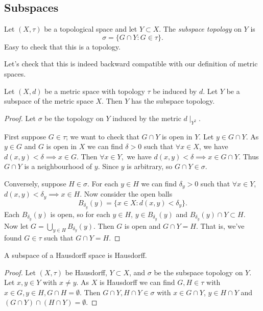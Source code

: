 \subsection{Subspaces}
\vspace{3mm}
\begin{definition}
Let $(X,\tau)$ be a topological space and let $Y\subset X$. The \emph{subspace topology} on $Y$ is \[ \sigma = \{G\cap Y : G\in \tau \}.\] Easy to check that this is a topology.
\end{definition}

Let's check that this is indeed backward compatible with our definition of metric spaces.

\begin{proposition}                        %
Let $(X,d)$ be a metric space with topology $\tau$ be induced by $d$. Let $Y$ be a subspace of the metric space $X$. Then $Y$ has the subspace topology.
\end{proposition}  
\begin{proof}
Let $\sigma$ be the topology on $Y$ induced by the metric $d\mid_{Y^2}$. 

First suppose $G\in \tau$; we want to check that $G\cap Y$ is open in $Y$. Let $y\in G\cap Y$. As $y\in G$ and $G$ is open in $X$ we can find $\delta >0$ such that $\forall x\in X$, we have $d(x,y)<\delta \implies x\in G$. Then $\forall x\in Y,$ we have $d(x,y)<\delta \implies x \in G\cap Y$. Thus $G\cap Y$ is a neighbourhood of $y$. Since $y$ is arbitrary, so $G\cap Y\in \sigma$.

Conversely, suppose $H\in \sigma$. For each $y\in H$ we can find $\delta_y>0$ such that $\forall x\in Y$, $d(x,y)<\delta_y\implies x\in H$. Now consider the open balls\[B_{\delta_y}(y) = \{x\in X : d(x,y) < \delta_y\}. \] Each $B_{\delta_y}(y)$ is open, so for each $y\in H$, $y\in B_{\delta_y}(y)$ and $B_{\delta_y}(y)\cap Y\subset H$. Now let $G = \bigcup_{y\in H}B_{\delta_y}(y)$. Then $G$ is open and $G\cap Y= H$. That is, we've found $G\in \tau$ such that $G\cap Y = H$.
\end{proof}

\begin{proposition}                            %
A subspace of a Hausdorff space is Hausdorff.
\end{proposition}
\begin{proof}
Let $(X,\tau)$ be Hausdorff, $Y\subset X$, and $\sigma$ be the subspace topology on $Y$. Let $x,y\in Y$ with $x\neq y$. As $X$ is Hausdorff we can find $G,H\in \tau$ with $x\in G, y\in H, G\cap H = \emptyset$. Then $G\cap Y, H\cap Y \in \sigma$ with $x\in G\cap Y$, $y\in H\cap Y$ and $(G\cap Y)\cap (H\cap Y) = \emptyset$.
\end{proof}

